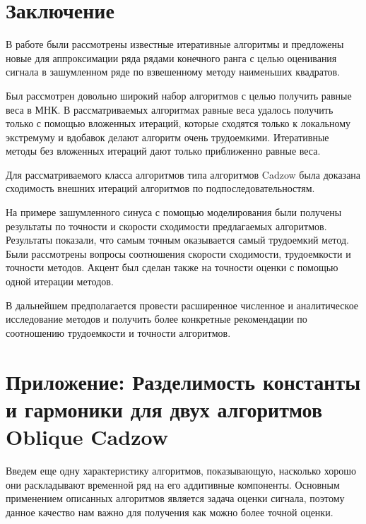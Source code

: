 \documentclass[12pt,a4paper,fleqn,leqno]{article}
\begin{document}
\section{Заключение}
\label{sec:concl}
В работе были рассмотрены известные итеративные алгоритмы и предложены новые для аппроксимации ряда рядами конечного ранга с целью
оценивания сигнала в зашумленном ряде по взвешенному методу наименьших квадратов.


Был рассмотрен довольно широкий набор алгоритмов с целью получить равные веса в МНК. В рассматриваемых алгоритмах равные веса удалось
получить только с помощью вложенных итераций, которые сходятся только к локальному экстремуму и вдобавок делают алгоритм очень трудоемкими.
Итеративные методы без вложенных итераций дают только приближенно равные веса.

Для рассматриваемого класса алгоритмов типа алгоритмов Cadzow была доказана сходимость внешних итераций алгоритмов по подпоследовательностям.

На примере зашумленного синуса с помощью моделирования были получены результаты по точности и скорости сходимости предлагаемых алгоритмов.
Результаты показали, что самым точным оказывается самый трудоемкий метод.
Были рассмотрены вопросы соотношения скорости сходимости, трудоемкости и точности методов.
Акцент был сделан также на точности оценки с помощью одной итерации методов.

В дальнейшем предполагается провести расширенное численное и аналитическое исследование методов и получить более конкретные рекомендации по
соотношению трудоемкости и точности алгоритмов.




\section{Приложение: Разделимость константы и гармоники для двух алгоритмов Oblique Cadzow}
\label{sec:app}

Введем еще одну характеристику алгоритмов, показывающую, насколько хорошо они раскладывают временной ряд на его аддитивные компоненты. Основным применением описанных алгоритмов является задача оценки сигнала, поэтому данное качество нам важно для получения как можно более точной оценки.
\end{document}
